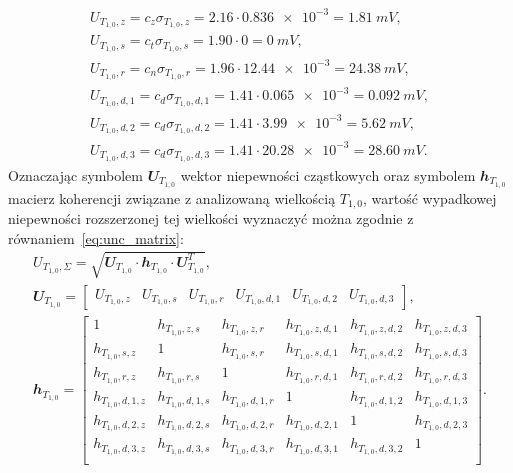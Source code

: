\begin{gather}
U_{T_{1,0},z} = c_{z} \sigma_{T_{1,0},z} = \num{2.16} \cdot \num{0.836e-3} = \qty{1.81}{mV} \label{eq:sym_partd_output_unc_roun_T_1_0},\\
U_{T_{1,0},s} = c_{t} \sigma_{T_{1,0},s} = \num{1.90} \cdot \num{0} = \qty{0}{mV} \label{eq:sym_partd_output_unc_stat_T_1_0}, \\
U_{T_{1,0},r} = c_{n} \sigma_{T_{1,0},r} = \num{1.96} \cdot \num{12.44e-3} = \qty{24.38}{mV} \label{eq:sym_partd_output_unc_rand_T_1_0}, \\
U_{T_{1,0},d,1} = c_{d} \sigma_{T_{1,0},d,1} = \num{1.41} \cdot \num{0.065e-3} = \qty{0.092}{mV} \label{eq:sym_partd_output_unc_dyn_1_T_1_0}, \\
U_{T_{1,0},d,2} = c_{d} \sigma_{T_{1,0},d,2} = \num{1.41} \cdot \num{3.99e-3} = \qty{5.62}{mV} \label{eq:sym_partd_output_unc_dyn_2_T_1_0}, \\
U_{T_{1,0},d,3} = c_{d} \sigma_{T_{1,0},d,3} = \num{1.41} \cdot \num{20.28e-3} = \qty{28.60}{mV} \label{eq:sym_partd_output_unc_dyn_3_T_1_0}.
\end{gather}
Oznaczając symbolem $\mathbfit{U}_{T_{1,0}}$ wektor niepewności cząstkowych oraz symbolem  $\mathbfit{h}_{T_{1,0}}$ macierz koherencji związane z analizowaną wielkością $T_{1,0}$, wartość wypadkowej niepewności rozszerzonej tej wielkości wyznaczyć można zgodnie z równaniem~\eqref{eq:unc_matrix}:
\begin{gather}
U_{T_{1,0},\Sigma} = \sqrt{\mathbfit{U}_{T_{1,0}} \cdot \mathbfit{h}_{T_{1,0}} \cdot \mathbfit{U}_{T_{1,0}}^{T}} \label{eq:sym_partd_output_unc_summul_T_1_0}, \\
\mathbfit{U}_{T_{1,0}} =
\begin{bmatrix}
U_{T_{1,0},z} & U_{T_{1,0},s} & U_{T_{1,0},r} & U_{T_{1,0},d,1} & U_{T_{1,0},d,2} & U_{T_{1,0},d,3}
\end{bmatrix}
\label{eq:sym_partd_output_unc_sumuvect_T_1_0_a}, \\
\mathbfit{h}_{T_{1,0}} =
\begin{bmatrix}
1                 & h_{T_{1,0},z,s}   & h_{T_{1,0},z,r}   & h_{T_{1,0},z,d,1} & h_{T_{1,0},z,d,2} & h_{T_{1,0},z,d,3} \\
h_{T_{1,0},s,z}   & 1                 & h_{T_{1,0},s,r}   & h_{T_{1,0},s,d,1} & h_{T_{1,0},s,d,2} & h_{T_{1,0},s,d,3} \\
h_{T_{1,0},r,z}   & h_{T_{1,0},r,s}   & 1                 & h_{T_{1,0},r,d,1} & h_{T_{1,0},r,d,2} & h_{T_{1,0},r,d,3} \\
h_{T_{1,0},d,1,z} & h_{T_{1,0},d,1,s} & h_{T_{1,0},d,1,r} & 1                 & h_{T_{1,0},d,1,2} & h_{T_{1,0},d,1,3} \\
h_{T_{1,0},d,2,z} & h_{T_{1,0},d,2,s} & h_{T_{1,0},d,2,r} & h_{T_{1,0},d,2,1} & 1                 & h_{T_{1,0},d,2,3} \\
h_{T_{1,0},d,3,z} & h_{T_{1,0},d,3,s} & h_{T_{1,0},d,3,r} & h_{T_{1,0},d,3,1} & h_{T_{1,0},d,3,2} & 1                 \\
\end{bmatrix}
\label{eq:sym_partd_output_unc_sumcoher_T_1_0_a}.
\end{gather}
